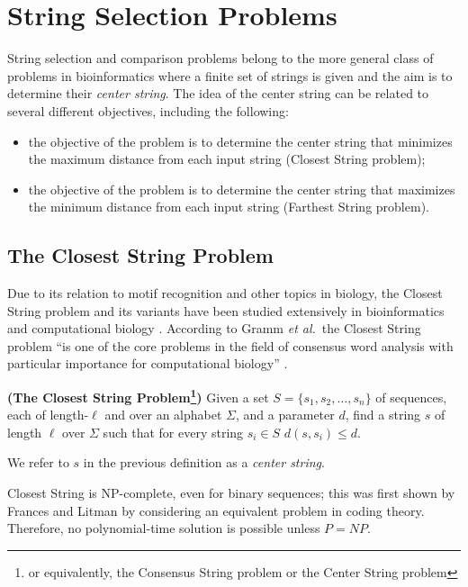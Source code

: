 \section{String Selection Problems}

String selection and comparison problems belong to the more general class of problems in bioinformatics where a finite set of strings is given and the aim is to determine their {\em center string}. The idea of the center string can be related to several different objectives, including the following:

\begin{itemize}
\item the objective of the problem is to determine the center string that minimizes the maximum distance from each input string ({\sc Closest String} problem);
\item the objective of the problem is to determine the center string that maximizes the minimum distance from each input string ({\sc Farthest String} problem).
\end{itemize}

\subsection{The {\sc Closest String} Problem}

Due to its relation to motif recognition and other topics in biology, the {\sc Closest String} problem and its variants have been studied extensively in bioinformatics and computational biology \cite{brona1,brona2,GNR03,LLMWZ00,LMW02,MS08,MTL,tompa}.  According to Gramm {\em et al.}\ the {\sc Closest String} problem ``is one of the core problems in the field of consensus word analysis with particular importance for computational biology'' \cite{GNR03}. 

\begin{definition} \label{closest_string_def} {\bf (The Closest String Problem\footnote{or equivalently, the {\sc Consensus String} problem or the {\sc Center String} problem})}  Given a set $S = \{s_1, s_2, \ldots, s_n\}$ of sequences, each of length-$\ell$ and over an alphabet $\Sigma$, and a parameter $d$, find a string $s$ of length $\ell$ over $\Sigma$ such that for every string $s_i \in S$ $d(s, s_i) \leq d$.  \end{definition}

We refer to $s$ in the previous definition as a {\em center string}. 

{\sc Closest String} is NP-complete, even for binary sequences; this was first shown by Frances and Litman \cite{FL97} by considering an equivalent problem in coding theory.  Therefore, no polynomial-time solution is possible unless $P = NP$. 

